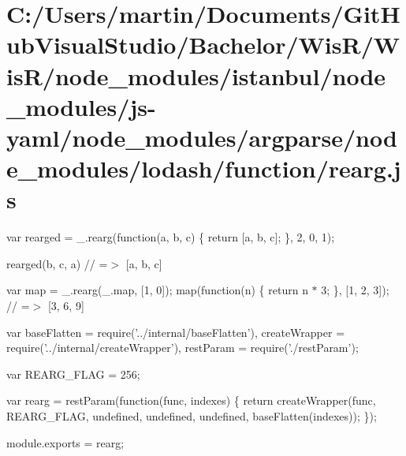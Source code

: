 \hypertarget{_c_1_2_users_2martin_2_documents_2_git_hub_visual_studio_2_bachelor_2_wis_r_2_wis_r_2node_modulecce61a15ebdcc64fe6a6f397d02c333c}{}\section{C\+:/\+Users/martin/\+Documents/\+Git\+Hub\+Visual\+Studio/\+Bachelor/\+Wis\+R/\+Wis\+R/node\+\_\+modules/istanbul/node\+\_\+modules/js-\/yaml/node\+\_\+modules/argparse/node\+\_\+modules/lodash/function/rearg.\+js}
var rearged = \+\_\+.\+rearg(function(a, b, c) \{ return \mbox{[}a, b, c\mbox{]}; \}, 2, 0, 1);

rearged(\textquotesingle{}b\textquotesingle{}, \textquotesingle{}c\textquotesingle{}, \textquotesingle{}a\textquotesingle{}) // =$>$ \mbox{[}\textquotesingle{}a\textquotesingle{}, \textquotesingle{}b\textquotesingle{}, \textquotesingle{}c\textquotesingle{}\mbox{]}

var map = \+\_\+.\+rearg(\+\_\+.\+map, \mbox{[}1, 0\mbox{]}); map(function(n) \{ return n $\ast$ 3; \}, \mbox{[}1, 2, 3\mbox{]}); // =$>$ \mbox{[}3, 6, 9\mbox{]}


\begin{DoxyCodeInclude}
var baseFlatten = require(\textcolor{stringliteral}{'../internal/baseFlatten'}),
    createWrapper = require(\textcolor{stringliteral}{'../internal/createWrapper'}),
    restParam = require(\textcolor{stringliteral}{'./restParam'});

var REARG\_FLAG = 256;

var rearg = restParam(\textcolor{keyword}{function}(func, indexes) \{
  \textcolor{keywordflow}{return} createWrapper(func, REARG\_FLAG, undefined, undefined, undefined, baseFlatten(indexes));
\});

module.exports = rearg;
\end{DoxyCodeInclude}
 